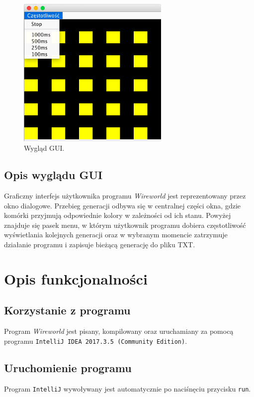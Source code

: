 \documentclass[a4paper,12pt,oneside]{article}
\begin{document}
\begin{figure}[ht]
\centering
\includegraphics[width=0.65\textwidth]{gui.png}
\caption{Wygląd GUI.}
\label{fig:k1}
\end{figure}

\subsection{Opis wyglądu GUI}
Graficzny interfejs użytkownika programu \textit{Wireworld} jest reprezentowany przez okno dialogowe. Przebieg generacji odbywa się w centralnej części okna, gdzie komórki przyjmują odpowiednie kolory w zależności od ich stanu. Powyżej znajduje się pasek menu, w którym użytkownik programu dobiera częstotliwość wyświetlania kolejnych generacji oraz w wybranym  momencie zatrzymuje działanie programu i zapisuje bieżącą generację do pliku TXT.

\section{Opis funkcjonalności}


\subsection{Korzystanie z programu}
Program \textit{Wireworld} jest pisany, kompilowany oraz uruchamiany za pomocą programu \verb+IntelliJ IDEA 2017.3.5 (Community Edition)+.

\subsection{Uruchomienie programu}
Program \verb+IntelliJ+ wywoływany jest automatycznie po naciśnęciu przycisku \verb+run+.    
\end{document}
